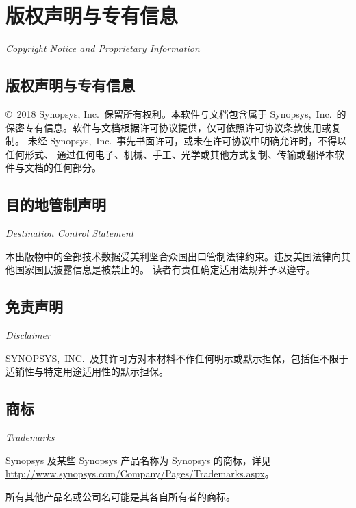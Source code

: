 \chapter*{版权声明与专有信息}

\noindent\textit{Copyright Notice and Proprietary Information}

\section*{版权声明与专有信息}

\copyright\ 2018 Synopsys, Inc.\ 保留所有权利。本软件与文档包含属于 Synopsys,~Inc.\
的保密专有信息。软件与文档根据许可协议提供，仅可依照许可协议条款使用或复制。
未经 Synopsys,~Inc.\ 事先书面许可，或未在许可协议中明确允许时，不得以任何形式、
通过任何电子、机械、手工、光学或其他方式复制、传输或翻译本软件与文档的任何部分。

\section*{目的地管制声明}

\noindent\textit{Destination Control Statement}

本出版物中的全部技术数据受美利坚合众国出口管制法律约束。违反美国法律向其他国家国民披露信息是被禁止的。
读者有责任确定适用法规并予以遵守。

\section*{免责声明}

\noindent\textit{Disclaimer}

SYNOPSYS,~INC.\ 及其许可方对本材料不作任何明示或默示担保，包括但不限于适销性与特定用途适用性的默示担保。

\section*{商标}

\noindent\textit{Trademarks}

Synopsys 及某些 Synopsys 产品名称为 Synopsys 的商标，详见
\url{http://www.synopsys.com/Company/Pages/Trademarks.aspx}。

所有其他产品名或公司名可能是其各自所有者的商标。

